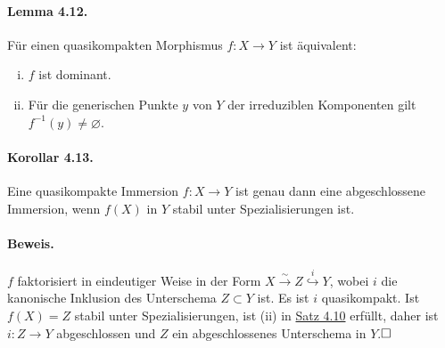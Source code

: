 \documentclass[11pt,b5paper,openany]{memoir}
\def \qed {$\hfill\square$}
\begin{document}
\paragraph{Lemma 4.12.}\label{4.12} Für einen quasikompakten Morphismus $f:X\to Y$ ist äquivalent:
\begin{enumerate}[(i)]
\item $f$ ist dominant.
\item Für die generischen Punkte $y$ von $Y$ der irreduziblen Komponenten gilt $f^{-1}(y)\neq\varnothing$.
\end{enumerate}

\iffalse
\paragraph{Beweis.} (ii)$\implies$(i) ist trivial. Für die andere Richtung ersetzen wir $f$ durch $f_\text{red}$ und nehmen $X,Y$ als reduziert an. Sei $y\in Y$ ein generischer Punkt einer irreduziblen Komponente von $Y$ und $U\subset_\text{o}Y$ eine affine Umgebung von $y$. $U$ ist insbesondere quasikompakt, also auch $f^{-1}(U)$, d.h. $f^{-1}(U)=\bigcup_iV_i$ hat eine endliche Überdeckung durch offene, affine $V_i$. Da $f$ nach Voraussetzung dominant ist, folgt $U=\overline{ff^{-1}(U)}=\bigcup_i\overline{f(V_i)}$. Daher gibt es ein $i$ mit $y\in\overline{f(V_i)}$. $\overline{f(V_i)}\subset U$ wird mit der reduzierten, abgeschlossenen Unterschemastruktur versehen. Da alle $V_i$ reduziert sind, faktorisiert $f|_{V_i}:V_i\to U$ eindeutig in der Form $V_i\stackrel{g}{\to} \overline{f(V_i)}\hookrightarrow U$.

Somit genügt es zu zeigen, dass $g^{-1}(y)\neq \varnothing$, da $g^{-1}(y)=f^{-1}(y)\cap V_i$. $y$ ist generischer Punkt einer irreduziblen Komponente von $Y$, daher gilt $\mathcal{O}_{U,y}=\mathcal{O}_{Y,y}$.
\fi

\paragraph{Korollar 4.13.}\label{4.13} Eine quasikompakte Immersion $f:X\to Y$ ist genau dann eine abgeschlossene Immersion, wenn $f(X)$ in $Y$ stabil unter Spezialisierungen ist.

\paragraph{Beweis.} $f$ faktorisiert in eindeutiger Weise in der Form $X\stackrel{\sim}{\to}Z\stackrel{i}{\hookrightarrow} Y$, wobei $i$ die kanonische Inklusion des Unterschema $Z\subset Y$ ist. Es ist $i$ quasikompakt. Ist $f(X)=Z$ stabil unter Spezialisierungen, ist (ii) in \hyperref[4.10]{Satz 4.10} erfüllt, daher ist $i:Z\to Y$ abgeschlossen und $Z$ ein abgeschlossenes Unterschema in $Y$.\qed
\end{document}
